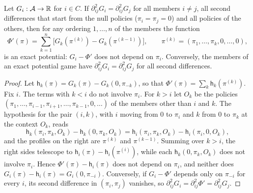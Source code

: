 \begin{lemma}\label{lem:agy-four-cycle}
Let $G_i:\mathcal A\to\mathbb{R}$ for $i\in C$. If $\partial^2_{ij}G_i=\partial^2_{ij}G_j$ for all members $i\ne j$, all second differences that start from the null policies ($\pi_i=\pi_j=0$) and all policies of the others, then for any ordering $1,\dots,n$ of the members the function
\begin{equation*}
\Phi'(\pi)=\sum_{k=1}^n\bigl[G_k(\pi^{(k)})-G_k(\pi^{(k-1)})\bigr],\qquad\pi^{(k)}=(\pi_1,\dots,\pi_k,0,\dots,0),
\end{equation*}
is an exact potential: $G_i-\Phi'$ does not depend on $\pi_i$. Conversely, the members of an exact potential game have $\partial^2_{ij}G_i=\partial^2_{ij}G_j$ for all second differences.
\end{lemma}

\begin{proof}
Let $\mathsf h_k(\pi)=G_k(\pi)-G_k(0,\pi_{-k})$, so that $\Phi'(\pi)=\sum_k\mathsf h_k(\pi^{(k)})$. Fix $i$. The terms with $k<i$ do not involve $\pi_i$. For $k>i$ let $O_k$ be the policies $(\pi_1,\dots,\pi_{i-1},\pi_{i+1},\dots,\pi_{k-1},0,\dots)$ of the members other than $i$ and $k$. The hypothesis for the pair $(i,k)$, with $i$ moving from $0$ to $\pi_i$ and $k$ from $0$ to $\pi_k$ at the context $O_k$, reads
\begin{equation*}
\mathsf h_k(\pi_i,\pi_k,O_k)-\mathsf h_k(0,\pi_k,O_k)=\mathsf h_i(\pi_i,\pi_k,O_k)-\mathsf h_i(\pi_i,0,O_k),
\end{equation*}
and the profiles on the right are $\pi^{(k)}$ and $\pi^{(k-1)}$. Summing over $k>i$, the right sides telescope to $\mathsf h_i(\pi)-\mathsf h_i(\pi^{(i)})$, while each $\mathsf h_k(0,\pi_k,O_k)$ does not involve $\pi_i$. Hence $\Phi'(\pi)-\mathsf h_i(\pi)$ does not depend on $\pi_i$, and neither does $G_i(\pi)-\mathsf h_i(\pi)=G_i(0,\pi_{-i})$. Conversely, if $G_i-\Phi'$ depends only on $\pi_{-i}$ for every $i$, its second difference in $(\pi_i,\pi_j)$ vanishes, so $\partial^2_{ij}G_i=\partial^2_{ij}\Phi'=\partial^2_{ij}G_j$.
\end{proof}

